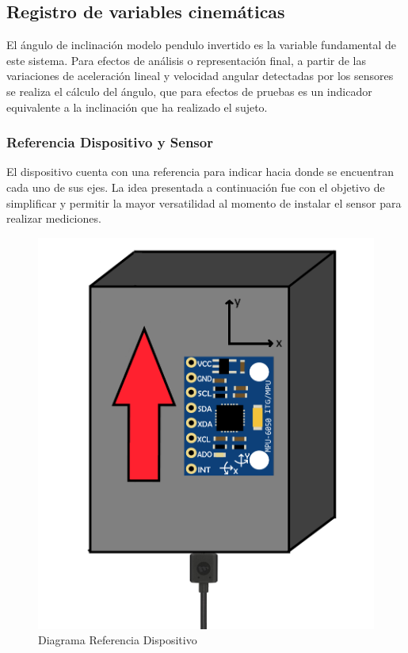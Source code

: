 \documentclass[12pt,a4paper]{article}
\begin{document}
\newpage
\subsection{Registro de variables cinemáticas}
El ángulo de inclinación modelo pendulo invertido\cite{gage_kinematic_2004} es la variable fundamental de este sistema.
Para efectos de análisis o representación final, a partir de las variaciones de aceleración lineal y velocidad angular detectadas por los sensores se realiza el cálculo del ángulo, que para efectos de pruebas es un indicador equivalente a la inclinación que ha realizado el sujeto.

\subsubsection{Referencia Dispositivo y Sensor}
El dispositivo cuenta con una referencia para indicar hacia donde se encuentran cada uno de sus ejes. La idea presentada a continuación fue con el objetivo de simplificar y permitir la mayor versatilidad al momento de instalar el sensor para realizar mediciones.

\begin{figure}[H]
	\centering
	\includegraphics[scale=0.2]{images/referenciaDispositivo}
	\caption{Diagrama Referencia Dispositivo}
	\label{fig:referenciaDisp}
\end{figure}
\end{document}
